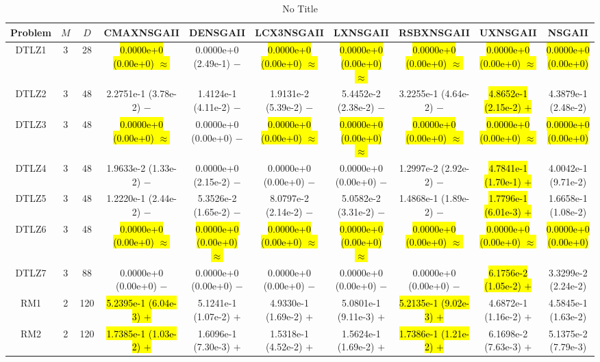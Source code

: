 \documentclass[journal]{IEEEtran}
\begin{document}
\begin{table*}[htbp]
\renewcommand{\arraystretch}{1.2}
\centering
\caption{No Title}
\begin{tabular}{cccccccccc}
\toprule
Problem&$M$&$D$&CMAXNSGAII&DENSGAII&LCX3NSGAII&LXNSGAII&RSBXNSGAII&UXNSGAII&NSGAII\\
\midrule
\multirow{1}{*}{DTLZ1}&3&28&\hl{0.0000e+0 (0.00e+0) $\approx$}&0.0000e+0 (2.49e-1) $-$&\hl{0.0000e+0 (0.00e+0) $\approx$}&\hl{0.0000e+0 (0.00e+0) $\approx$}&\hl{0.0000e+0 (0.00e+0) $\approx$}&\hl{0.0000e+0 (0.00e+0) $\approx$}&\hl{0.0000e+0 (0.00e+0)}\\
\hline
\multirow{1}{*}{DTLZ2}&3&48&2.2751e-1 (3.78e-2) $-$&1.4124e-1 (4.11e-2) $-$&1.9131e-2 (5.39e-2) $-$&5.4452e-2 (2.38e-2) $-$&3.2255e-1 (4.64e-2) $-$&\hl{4.8652e-1 (2.15e-2) $+$}&4.3879e-1 (2.48e-2)\\
\hline
\multirow{1}{*}{DTLZ3}&3&48&\hl{0.0000e+0 (0.00e+0) $\approx$}&0.0000e+0 (0.00e+0) $-$&\hl{0.0000e+0 (0.00e+0) $\approx$}&\hl{0.0000e+0 (0.00e+0) $\approx$}&\hl{0.0000e+0 (0.00e+0) $\approx$}&\hl{0.0000e+0 (0.00e+0) $\approx$}&\hl{0.0000e+0 (0.00e+0)}\\
\hline
\multirow{1}{*}{DTLZ4}&3&48&1.9633e-2 (1.33e-2) $-$&0.0000e+0 (2.15e-2) $-$&0.0000e+0 (0.00e+0) $-$&0.0000e+0 (0.00e+0) $-$&1.2997e-2 (2.92e-2) $-$&\hl{4.7841e-1 (1.70e-1) $+$}&4.0042e-1 (9.71e-2)\\
\hline
\multirow{1}{*}{DTLZ5}&3&48&1.2220e-1 (2.44e-2) $-$&5.3526e-2 (1.65e-2) $-$&8.0797e-2 (2.14e-2) $-$&5.0582e-2 (3.31e-2) $-$&1.4868e-1 (1.89e-2) $-$&\hl{1.7796e-1 (6.01e-3) $+$}&1.6658e-1 (1.08e-2)\\
\hline
\multirow{1}{*}{DTLZ6}&3&48&\hl{0.0000e+0 (0.00e+0) $\approx$}&\hl{0.0000e+0 (0.00e+0) $\approx$}&\hl{0.0000e+0 (0.00e+0) $\approx$}&\hl{0.0000e+0 (0.00e+0) $\approx$}&\hl{0.0000e+0 (0.00e+0) $\approx$}&\hl{0.0000e+0 (0.00e+0) $\approx$}&\hl{0.0000e+0 (0.00e+0)}\\
\hline
\multirow{1}{*}{DTLZ7}&3&88&0.0000e+0 (0.00e+0) $-$&0.0000e+0 (0.00e+0) $-$&0.0000e+0 (0.00e+0) $-$&0.0000e+0 (0.00e+0) $-$&0.0000e+0 (0.00e+0) $-$&\hl{6.1756e-2 (1.05e-2) $+$}&3.3299e-2 (2.24e-2)\\
\hline
\multirow{1}{*}{RM1}&2&120&\hl{5.2395e-1 (6.04e-3) $+$}&5.1241e-1 (1.07e-2) $+$&4.9330e-1 (1.69e-2) $+$&5.0801e-1 (9.11e-3) $+$&\hl{5.2135e-1 (9.02e-3) $+$}&4.6872e-1 (1.16e-2) $+$&4.5845e-1 (1.63e-2)\\
\hline
\multirow{1}{*}{RM2}&2&120&\hl{1.7385e-1 (1.03e-2) $+$}&1.6096e-1 (7.30e-3) $+$&1.5318e-1 (4.52e-2) $+$&1.5624e-1 (1.69e-2) $+$&\hl{1.7386e-1 (1.21e-2) $+$}&6.1698e-2 (7.63e-3) $+$&5.1375e-2 (7.79e-3)\\

\end{tabular}
\end{table*}
\end{document}
